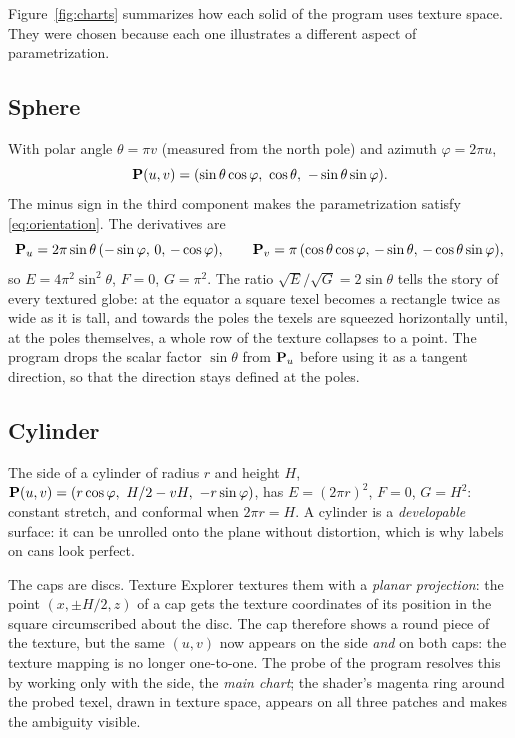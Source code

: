 Figure~\ref{fig:charts} summarizes how each solid of the program uses texture space.
They were chosen because each one illustrates a different aspect of parametrization.

\subsection{Sphere}
With polar angle $\theta=\pi v$ (measured from the north pole) and azimuth $\varphi=2\pi u$,
\[
  \vect P(u,v) = (\sin\theta\cos\varphi,\ \cos\theta,\ -\sin\theta\sin\varphi).
\]
The minus sign in the third component makes the parametrization satisfy
\eqref{eq:orientation}. The derivatives are
\[
  \mathbf{P}_u = 2\pi\sin\theta\,(-\sin\varphi,\,0,\,-\cos\varphi),\qquad
  \mathbf{P}_v = \pi\,(\cos\theta\cos\varphi,\,-\sin\theta,\,-\cos\theta\sin\varphi),
\]
so $E = 4\pi^2\sin^2\theta$, $F=0$, $G=\pi^2$. The ratio $\sqrt E/\sqrt G = 2\sin\theta$ tells
the story of every textured globe: at the equator a square texel becomes a rectangle twice as
wide as it is tall, and towards the poles the texels are squeezed horizontally until, at the
poles themselves, a whole row of the texture collapses to a point. The program drops the scalar
factor $\sin\theta$ from $\mathbf{P}_u$ before using it as a tangent direction, so that the
direction stays defined at the poles.

\subsection{Cylinder}
The side of a cylinder of radius $r$ and height $H$,
$\vect P(u,v)=(r\cos\varphi,\ H/2-vH,\ -r\sin\varphi)$, has $E=(2\pi r)^2$, $F=0$, $G=H^2$:
constant stretch, and conformal when $2\pi r = H$. A cylinder is a \emph{developable} surface:
it can be unrolled onto the plane without distortion, which is why labels on cans look
perfect.

The caps are discs. Texture Explorer textures them with a \emph{planar projection}: the point
$(x,\pm H/2,z)$ of a cap gets the texture coordinates of its position in the square
circumscribed about the disc. The cap therefore shows a round piece of the texture, but the
same $(u,v)$ now appears on the side \emph{and} on both caps: the texture mapping is no longer
one-to-one. The probe of the program resolves this by working only with the side, the
\emph{main chart}; the shader's magenta ring around the probed texel, drawn in texture space,
appears on all three patches and makes the ambiguity visible.

